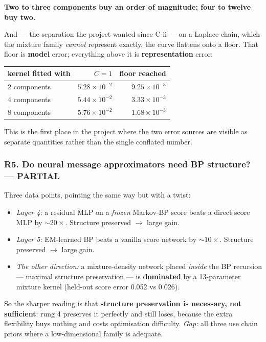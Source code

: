 \documentclass[11pt,a4paper]{article}
\newcommand{\partialx}{\textcolor{WarnAmber}{\textbf{PARTIAL}}}
\begin{document}
\noindent
\textbf{Two to three components buy an order of magnitude; four to twelve buy two.}

And --- the separation the project wanted since C-ii --- on a Laplace chain, which the
mixture family \emph{cannot} represent exactly, the curve flattens onto a floor. That floor
is \textbf{model} error; everything above it is \textbf{representation} error:

\begin{center}
\begin{tabular}{@{}lrr@{}}
\toprule
kernel fitted with & $C=1$ & floor reached \\
\midrule
2 components & $5.28\times10^{-2}$ & $9.25\times10^{-3}$ \\
4 components & $5.44\times10^{-2}$ & $3.33\times10^{-3}$ \\
8 components & $5.76\times10^{-2}$ & $1.68\times10^{-3}$ \\
\bottomrule
\end{tabular}
\end{center}

\noindent
This is the first place in the project where the two error sources are visible as separate
quantities rather than the single conflated number.

\subsubsection*{R5. Do neural message approximators need BP structure? --- \partialx}

Three data points, pointing the same way but with a twist:

\begin{itemize}
\item \emph{Layer 4:} a residual MLP on a \emph{frozen} Markov-BP score beats a direct score
MLP by ${\sim}20\times$. Structure preserved $\to$ large gain.
\item \emph{Layer 5:} EM-learned BP beats a vanilla score network by ${\sim}10\times$.
Structure preserved $\to$ large gain.
\item \emph{The other direction:} a mixture-density network placed \emph{inside} the BP
recursion --- maximal structure preservation --- is \textbf{dominated} by a 13-parameter
mixture kernel (held-out score error 0.052 vs 0.026).
\end{itemize}

\noindent
So the sharper reading is that \textbf{structure preservation is necessary, not
sufficient}: rung 4 preserves it perfectly and still loses, because the extra flexibility
buys nothing and costs optimisation difficulty. \emph{Gap:} all three use chain priors where
a low-dimensional family is adequate.
\end{document}
